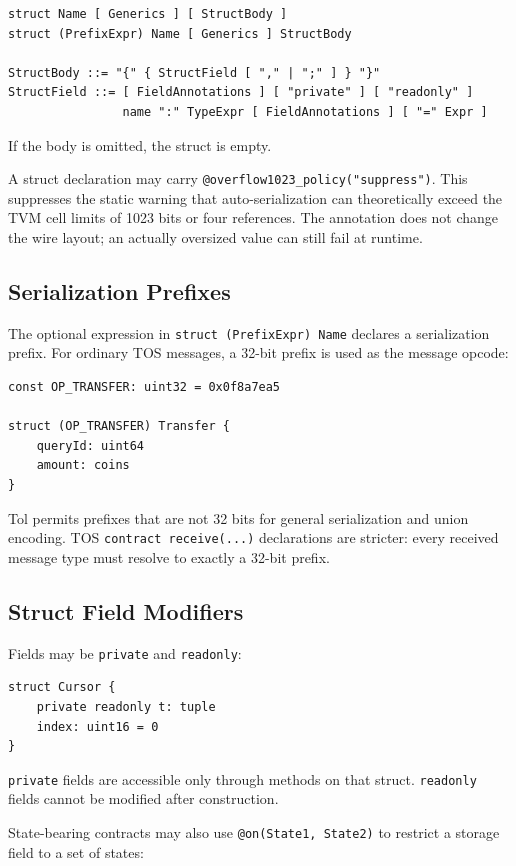 \documentclass[12pt,oneside]{article}
\begin{document}
\begin{verbatim}
struct Name [ Generics ] [ StructBody ]
struct (PrefixExpr) Name [ Generics ] StructBody

StructBody ::= "{" { StructField [ "," | ";" ] } "}"
StructField ::= [ FieldAnnotations ] [ "private" ] [ "readonly" ]
                name ":" TypeExpr [ FieldAnnotations ] [ "=" Expr ]
\end{verbatim}

If the body is omitted, the struct is empty.

A struct declaration may carry \verb|@overflow1023_policy("suppress")|. This
suppresses the static warning that auto-serialization can theoretically exceed
the TVM cell limits of 1023 bits or four references. The annotation does not
change the wire layout; an actually oversized value can still fail at runtime.

\subsection{Serialization Prefixes}
The optional expression in \verb|struct (PrefixExpr) Name| declares a
serialization prefix. For ordinary TOS messages, a 32-bit prefix is used as the
message opcode:

\begin{verbatim}
const OP_TRANSFER: uint32 = 0x0f8a7ea5

struct (OP_TRANSFER) Transfer {
    queryId: uint64
    amount: coins
}
\end{verbatim}

Tol permits prefixes that are not 32 bits for general serialization and union
encoding. TOS \verb|contract receive(...)| declarations are stricter: every
received message type must resolve to exactly a 32-bit prefix.

\subsection{Struct Field Modifiers}
Fields may be \verb|private| and \verb|readonly|:

\begin{verbatim}
struct Cursor {
    private readonly t: tuple
    index: uint16 = 0
}
\end{verbatim}

\verb|private| fields are accessible only through methods on that struct.
\verb|readonly| fields cannot be modified after construction.

State-bearing contracts may also use \verb|@on(State1, State2)| to restrict a
storage field to a set of states:
\end{document}
